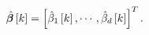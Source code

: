 \begin{equation*}
\hat{\boldsymbol{\beta}}\left[ k \right] = \left[ \hat{\beta}_1\left[ k \right], \cdots, \hat{\beta}_{d} \left[ k \right] \right]^T.
\end{equation*}